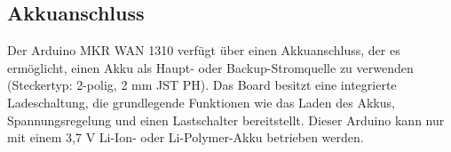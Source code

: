 \subsection{Akkuanschluss \label{powerSupply:battery}}

	Der Arduino MKR WAN 1310 verfügt über einen Akkuanschluss, der es ermöglicht, einen Akku als Haupt- oder Backup-Stromquelle zu verwenden (Steckertyp: 2-polig, 2 mm JST PH). Das Board besitzt eine integrierte Ladeschaltung, die grundlegende Funktionen wie das Laden des Akkus, Spannungsregelung und einen Lastschalter bereitstellt.
	Dieser Arduino kann nur mit einem 3,7 V Li-Ion- oder Li-Polymer-Akku betrieben werden.
	

